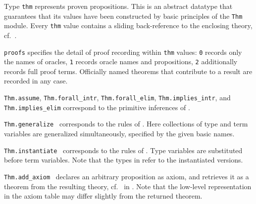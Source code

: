 \begin{isabellebody}
\begin{isamarkuptext}
\begin{description}
  \item Type \verb|thm| represents proven propositions.  This is
  an abstract datatype that guarantees that its values have been
  constructed by basic principles of the \verb|Thm| module.
  Every \verb|thm| value contains a sliding back-reference to the
  enclosing theory, cf.\ .

  \item \verb|proofs| specifies the detail of proof recording within
  \verb|thm| values: \verb|0| records only the names of oracles,
  \verb|1| records oracle names and propositions, \verb|2| additionally
  records full proof terms.  Officially named theorems that contribute
  to a result are recorded in any case.

  \item \verb|Thm.assume|, \verb|Thm.forall_intr|, \verb|Thm.forall_elim|, \verb|Thm.implies_intr|, and \verb|Thm.implies_elim|
  correspond to the primitive inferences of .

  \item \verb|Thm.generalize|~
  corresponds to the  rules of
  .  Here collections of type and term
  variables are generalized simultaneously, specified by the given
  basic names.

  \item \verb|Thm.instantiate|~ corresponds to the  rules
  of .  Type variables are substituted before
  term variables.  Note that the types in 
  refer to the instantiated versions.

  \item \verb|Thm.add_axiom|~ declares an
  arbitrary proposition as axiom, and retrieves it as a theorem from
  the resulting theory, cf.\  in
  .  Note that the low-level representation in
  the axiom table may differ slightly from the returned theorem.


\end{description}
\end{isamarkuptext}
\end{isabellebody}
